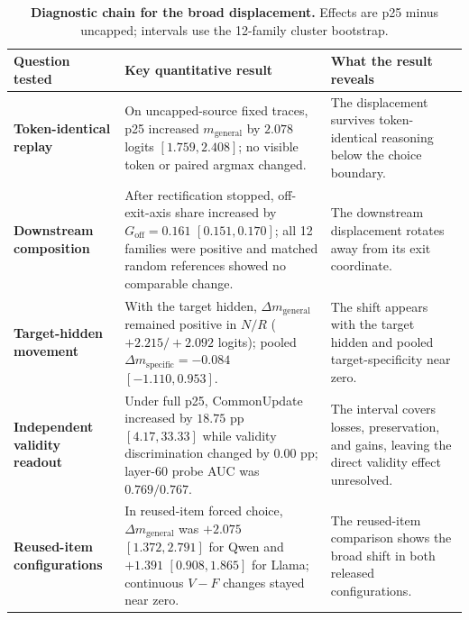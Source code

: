 \documentclass[letterpaper]{article} %
\begin{document}
\begin{table}[t]
\centering
\small
\setlength{\tabcolsep}{4pt}
\renewcommand{\arraystretch}{1.12}
\begin{tabular}{@{}L{0.20\textwidth}L{0.38\textwidth}L{0.34\textwidth}@{}}
\toprule
Question tested & Key quantitative result & What the result reveals \\
\midrule

\textbf{Token-identical}\newline
\textbf{replay}
&
On uncapped-source fixed traces, p25 increased
$m_{\mathrm{general}}$ by $2.078$ logits $[1.759,2.408]$; no visible token or
paired argmax changed.
&
The displacement survives token-identical reasoning below the choice boundary.
\\

\addlinespace

\textbf{Downstream}\newline
\textbf{composition}
&
After rectification stopped, off-exit-axis share increased by
$G_{\mathrm{off}}=0.161$ $[0.151,0.170]$; all 12 families were positive and
matched random references showed no comparable change.
&
The downstream displacement rotates away from its exit coordinate.
\\

\addlinespace

\textbf{Target-hidden}\newline
\textbf{movement}
&
With the target hidden, $\Delta m_{\mathrm{general}}$ remained positive in
$N/R$ ($+2.215/+2.092$ logits); pooled
$\Delta m_{\mathrm{specific}}=-0.084$ $[-1.110,0.953]$.
&
The shift appears with the target hidden and pooled target-specificity near zero.
\\

\addlinespace

\textbf{Independent validity}\newline
\textbf{readout}
&
Under full p25, CommonUpdate increased by $18.75$ pp
$[4.17,33.33]$ while validity discrimination changed by $0.00$ pp;
layer-60 probe AUC was $0.769/0.767$.
&
The interval covers losses, preservation, and gains, leaving the direct validity effect unresolved.
\\

\addlinespace

\textbf{Reused-item}\newline
\textbf{configurations}
&
In reused-item forced choice, $\Delta m_{\mathrm{general}}$ was
$+2.075$ $[1.372,2.791]$ for Qwen and $+1.391$ $[0.908,1.865]$ for Llama;
continuous $V-F$ changes stayed near zero.
&
The reused-item comparison shows the broad shift in both released configurations.
\\

\bottomrule
\end{tabular}
\caption{\textbf{Diagnostic chain for the broad displacement.} Effects are p25 minus uncapped; intervals use the 12-family cluster bootstrap.}
\label{tab:diagnostic-chain}
\end{table}
\end{document}
